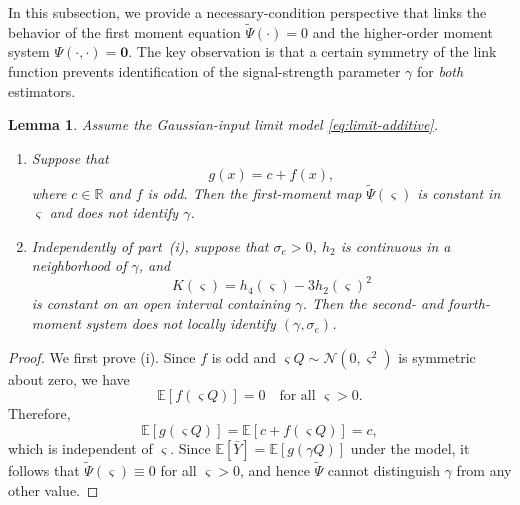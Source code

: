 \documentclass[12pt,reqno]{amsart}
\newtheorem{lemma}{Lemma}
\newcommand{\E}{\mathbb{E}}
\newcommand{\ccc}{\color{black}}
\def\bzero{\bm{0}}
\begin{document}
{In this subsection, we provide a necessary-condition perspective that links the behavior of
the first moment equation $\tilde\Psi(\cdot)=0$ and the higher-order moment system $\Psi(\cdot,\cdot)=\bzero$.
The key observation is that a certain symmetry of the link function prevents identification
of the signal-strength parameter $\gamma$ for \emph{both} estimators.

{\ccc
\begin{lemma}
Assume the Gaussian-input limit model \eqref{eq:limit-additive}.

\begin{enumerate}
    \item[(i)] Suppose that
    \[
    g(x)=c+f(x),
    \]
    where $c\in\mathbb{R}$ and $f$ is odd. Then the first-moment map
    $\tilde{\Psi}(\varsigma)$ is constant in $\varsigma$ and does not identify
    $\gamma$.

    \item[(ii)] Independently of part~(i), suppose that $\sigma_e>0$, $h_2$ is
    continuous in a neighborhood of $\gamma$, and
    \[
    K(\varsigma)=h_4(\varsigma)-3h_2(\varsigma)^2
    \]
    is constant on an open interval containing $\gamma$. Then the
    second- and fourth-moment system does not locally identify
    $(\gamma,\sigma_e)$.
\end{enumerate}
\end{lemma}
}

\begin{proof}
We first prove (i).
Since $f$ is odd and $\varsigma Q\sim\mathcal N(0,\varsigma^2)$ is symmetric about zero, we have
\[
\E[f(\varsigma Q)]=0 \quad \text{for all }\varsigma>0.
\]
Therefore,
\[
\E[g(\varsigma Q)]
=\E[c+f(\varsigma Q)]
=c,
\]
which is independent of $\varsigma$.
Since $\E[\bar Y]=\E[g(\gamma Q)]$ under the model, it follows that
$\tilde\Psi(\varsigma)\equiv 0$ for all $\varsigma>0$, and hence
$\tilde\Psi$ cannot distinguish $\gamma$ from any other value.


\end{proof}}
\end{document}
